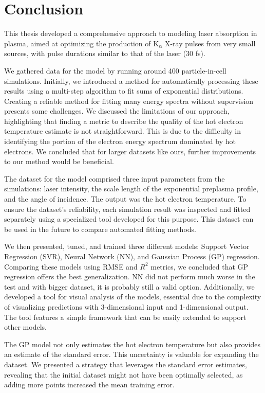 \chapter*{Conclusion}
This thesis developed a comprehensive approach to modeling laser absorption in plasma, aimed at optimizing the production of $\mathrm{K}_\mathrm{\alpha}$ X-ray pulses from very small sources, with pulse durations similar to that of the laser (30 fs).

We gathered data for the model by running around 400 particle-in-cell simulations. Initially, we introduced a method for automatically processing these results using a multi-step algorithm to fit sums of exponential distributions. Creating a reliable method for fitting many energy spectra without supervision presents some challenges. We discussed the limitations of our approach, highlighting that finding a metric to describe the quality of the hot electron temperature estimate is not straightforward. This is due to the difficulty in identifying the portion of the electron energy spectrum dominated by hot electrons. We concluded that for larger datasets like ours, further improvements to our method would be beneficial.

The dataset for the model comprised three input parameters from the simulations: laser intensity, the scale length of the exponential preplasma profile, and the angle of incidence. The output was the hot electron temperature. To ensure the dataset's reliability, each simulation result was inspected and fitted separately using a specialized tool developed for this purpose. This dataset can be used in the future to compare automated fitting methods.

We then presented, tuned, and trained three different models: Support Vector Regression (SVR), Neural Network (NN), and Gaussian Process (GP) regression. Comparing these models using RMSE and $R^2$ metrics, we concluded that GP regression offers the best generalization. NN did not perform much worse in the test and with bigger dataset, it is probably still a valid option. Additionally, we developed a tool for visual analysis of the models, essential due to the complexity of visualizing predictions with 3-dimensional input and 1-dimensional output. The tool features a simple framework that can be easily extended to support other models.

The GP model not only estimates the hot electron temperature but also provides an estimate of the standard error. This uncertainty is valuable for expanding the dataset. We presented a strategy that leverages the standard error estimates, revealing that the initial dataset might not have been optimally selected, as adding more points increased the mean training error. 

